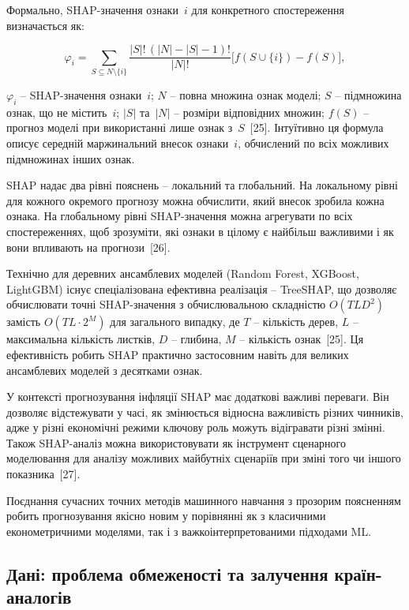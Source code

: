 \documentclass{bachelor_thesis}
\begin{document}
Формально, SHAP-значення ознаки~$i$ для конкретного спостереження визначається як:

\begin{equation*}
\varphi_i = \sum_{S\subseteq N\setminus\{i\}}
\frac{|S|!\,(|N|-|S|-1)!}{|N|!}
\bigl[f(S\cup\{i\})-f(S)\bigr],
\end{equation*}

 $\varphi_i$ -- SHAP-значення ознаки~$i$; $N$ -- повна множина ознак моделі; $S$ -- підмножина ознак, що не містить~$i$; $|S|$ та~$|N|$ -- розміри відповідних множин; $f(S)$ -- прогноз моделі при використанні лише ознак з~$S$~[25]. Інтуїтивно ця формула описує середній маржинальний внесок ознаки~$i$, обчислений по всіх можливих підмножинах інших ознак.

SHAP надає два рівні пояснень -- локальний та глобальний. На локальному рівні для кожного окремого прогнозу можна обчислити, який внесок зробила кожна ознака. На глобальному рівні SHAP-значення можна агрегувати по всіх спостереженнях, щоб зрозуміти, які ознаки в цілому є найбільш важливими і як вони впливають на прогнози~[26].

Технічно для деревних ансамблевих моделей (Random Forest, XGBoost, LightGBM) існує спеціалізована ефективна реалізація -- TreeSHAP, що дозволяє обчислювати точні SHAP-значення з обчислювальною складністю $O(TLD^2)$ замість $O(TL \cdot 2^M)$ для загального випадку, де $T$ -- кількість дерев, $L$ -- максимальна кількість листків, $D$ -- глибина, $M$ -- кількість ознак~[25]. Ця ефективність робить SHAP практично застосовним навіть для великих ансамблевих моделей з десятками ознак.

У контексті прогнозування інфляції SHAP має додаткові важливі переваги. Він дозволяє відстежувати у часі, як змінюється відносна важливість різних чинників, адже у різні економічні режими ключову роль можуть відігравати різні змінні. Також SHAP-аналіз можна використовувати як інструмент сценарного моделювання для аналізу можливих майбутніх сценаріїв при зміні того чи іншого показника~[27].

Поєднання сучасних точних методів машинного навчання з прозорим поясненням робить прогнозування якісно новим у порівнянні як з класичними економетричними моделями, так і з важкоінтерпретованими підходами ML.

\subsection{Дані: проблема обмеженості та залучення країн-аналогів}
\end{document}
